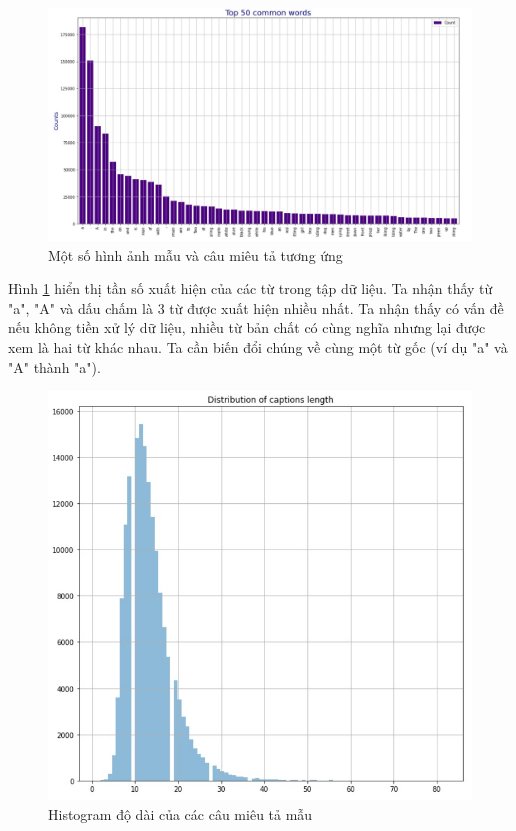 \documentclass[14pt, a4paper]{article}
\numberwithin{equation}{section}
\numberwithin{algorithm}{section}
\numberwithin{figure}{section}
\numberwithin{dl}{section}
\numberwithin{md}{section}
\numberwithin{bd}{section}
\numberwithin{dn}{section}
\numberwithin{hq}{section}
\begin{document}
    
    \begin{figure}[h!] \centering

        \includegraphics[scale=0.5]{Flickr_frequency_raw_word.jpg}
        \caption{Một số hình ảnh mẫu và câu miêu tả tương ứng}
        \label{fig:Flickr_frequency_raw_word}

    \end{figure}

    Hình \ref{fig:Flickr_frequency_raw_word} hiển thị tần số xuất hiện của các từ trong tập dữ liệu. Ta nhận thấy từ "a", "A" và dấu chấm là 3 từ được xuất hiện nhiều nhất.
    Ta nhận thấy có vấn đề nếu không tiền xử lý dữ liệu, nhiều từ bản chất có cùng nghĩa nhưng lại được xem là hai từ khác nhau. Ta cần biến đổi chúng về cùng một từ gốc (ví dụ "a" và "A" thành "a").

    \begin{figure}[h!] \centering

        \includegraphics[scale=0.5]{Flickr_Length_Distribution.jpg}
        \caption{Histogram độ dài của các câu miêu tả mẫu}
        \label{fig:Flickr_Length_Distribution}

    \end{figure}
\end{document}
